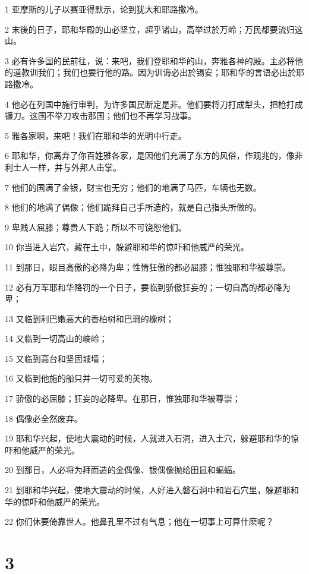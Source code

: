 \par 1 亚摩斯的儿子以赛亚得默示，论到犹大和耶路撒冷。
\par 2 末後的日子，耶和华殿的山必坚立，超乎诸山，高举过於万岭；万民都要流归这山。
\par 3 必有许多国的民前往，说：来吧，我们登耶和华的山，奔雅各神的殿。主必将他的道教训我们；我们也要行他的路。因为训诲必出於锡安；耶和华的言语必出於耶路撒冷。
\par 4 他必在列国中施行审判，为许多国民断定是非。他们要将刀打成犁头，把枪打成镰刀。这国不举刀攻击那国；他们也不再学习战事。
\par 5 雅各家啊，来吧！我们在耶和华的光明中行走。
\par 6 耶和华，你离弃了你百姓雅各家，是因他们充满了东方的风俗，作观兆的，像非利士人一样，并与外邦人击掌。
\par 7 他们的国满了金银，财宝也无穷；他们的地满了马匹，车辆也无数。
\par 8 他们的地满了偶像；他们跪拜自己手所造的，就是自己指头所做的。
\par 9 卑贱人屈膝；尊贵人下跪；所以不可饶恕他们。
\par 10 你当进入岩穴，藏在土中，躲避耶和华的惊吓和他威严的荣光。
\par 11 到那日，眼目高傲的必降为卑；性情狂傲的都必屈膝；惟独耶和华被尊崇。
\par 12 必有万军耶和华降罚的一个日子，要临到骄傲狂妄的；一切自高的都必降为卑；
\par 13 又临到利巴嫩高大的香柏树和巴珊的橡树；
\par 14 又临到一切高山的峻岭；
\par 15 又临到高台和坚固城墙；
\par 16 又临到他施的船只并一切可爱的美物。
\par 17 骄傲的必屈膝；狂妄的必降卑。在那日，惟独耶和华被尊崇；
\par 18 偶像必全然废弃。
\par 19 耶和华兴起，使地大震动的时候，人就进入石洞，进入土穴，躲避耶和华的惊吓和他威严的荣光。
\par 20 到那日，人必将为拜而造的金偶像、银偶像抛给田鼠和蝙蝠。
\par 21 到耶和华兴起，使地大震动的时候，人好进入磐石洞中和岩石穴里，躲避耶和华的惊吓和他威严的荣光。
\par 22 你们休要倚靠世人。他鼻孔里不过有气息；他在一切事上可算什麽呢？

\chapter{3}

